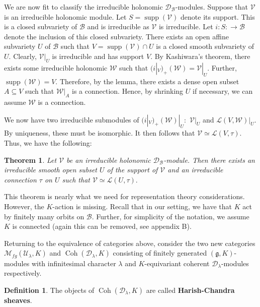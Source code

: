 \documentclass[letterpaper,twosided,11pt]{article}
\theoremstyle{plain}
\newtheorem{theorem}{Theorem}[section]
\theoremstyle{definition}
\newtheorem{definition}{Definition}
\theoremstyle{remark}
\newcommand{\script}[1]{\mathscr{#1}}
\newcommand{\lie}[1]{\mathfrak{#1}}
\begin{document}
We are now fit to classify the irreducible holonomic $ \mathcal{D}_\mathcal
{B} $-modules.  Suppose that $ \script{V} $ is an irreducible holonomic
module.  Let $ S=
\operatorname{supp}
(\script{V}) $ denote its support.  This is a closed subvariety of $
\mathcal{B} $ and is irreducible as $ \script{V} $ is irreducible.  Let $
i:S:\to \mathcal{B} $ denote the inclusion of this closed subvariety.
There exists an open affine subvariety $ U $ of $ \mathcal{B} $ such
that $ V=
\operatorname{supp}
(\script{V})\cap U $ is a closed smooth subvariety of $ U. $ Clearly, $
\script{V}|_U $ is irreducible and has support $ V. $ By Kashiwara's
theorem, there exists some irreducible holonomic $ \script{W} $ such
that $ (i|_V)_+(\script{W})=\script{V}|_U. $ Further, $
\operatorname{supp}
(\script{W})=V. $ Therefore, by the lemma, there exists a dense open
subset $ A\subseteq V $ such that $ \script{W}|_A $ is a connection.
Hence, by shrinking $ U $ if necessary, we can assume $ \script{W} $ is
a connection.

We now have two irreducible submodules of $ (i|_V)_+(\script{W})|_U: $ $
\script{V}|_U $ and $ \mathcal{L}(V,\script{W})|_U. $ By uniqueness,
these must be isomorphic.  It then follows that $ \script{V}\simeq
\mathcal{L}(V,\tau). $ Thus, we have the following:

\begin{theorem}
    Let $ \script{V} $ be an irreducible holonomic $ \mathcal{D}_\mathcal
    {B} $-module.  Then there exists an irreducible smooth open subset $
    U $ of the support of $ \script{V} $ and an irreducible connection $
    \tau $ on $ U $ such that $ \script{V}\simeq \mathcal{L}(U,\tau). $
\end{theorem}

This theorem is nearly what we need for representation theory
considerations.  However, the $ K $-action is missing.  Recall that in
our setting, we have that $ K $ act by finitely many orbits on $
\mathcal{B}. $ Further, for simplicity of the notation, we assume $ K $
is connected (again this can be removed, see
\cite{Hecht1987} appendix B).

Returning to the equivalence of categories above, consider the two new
categories $ \mathcal{M}_{fg}(\mathcal{U}_\lambda,K) $ and $
\operatorname{Coh}
(\mathcal{D}_\lambda,K) $ consisting of finitely generated $ (\lie{g},K)
$-modules with infinitesimal character $ \lambda $ and $ K $-equivariant
coherent $ \mathcal{D}_\lambda $-modules respectively.

\begin{definition}
    The objects of $
    \operatorname{Coh}
    (\mathcal{D}_\lambda,K) $ are called \textbf{Harish-Chandra sheaves}.
\end{definition}
\end{document}
